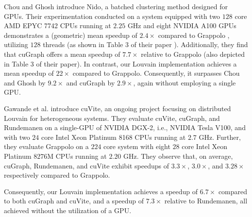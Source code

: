 Chou and Ghosh \cite{chou2022batched} introduce Nido, a batched clustering method designed for GPUs. Their experimentation conducted on a system equipped with two $128$ core AMD EPYC 7742 CPUs running at $2.25$ GHz and eight NVIDIA A100 GPUs demonstrates a (geometric) mean speedup of $2.4\times$ compared to Grappolo \cite{com-halappanavar17}, utilizing $128$ threads (as shown in Table 3 of their paper \cite{chou2022batched}). Additionally, they find that cuGraph \cite{hricik2020using} offers a mean speedup of $7.7\times$ relative to Grappolo (also depicted in Table 3 of their paper). In contrast, our Louvain implementation achieves a mean speedup of $22\times$ compared to Grappolo. Consequently, it surpasses Chou and Ghosh by $9.2\times$ and cuGraph by $2.9\times$, again without employing a single GPU.

Gawande et al. \cite{com-gawande22} introduce cuVite, an ongoing project focusing on distributed Louvain for heterogeneous systems. They evaluate cuVite, cuGraph, and Rundemanen on a single-GPU of NVIDIA DGX-2, i.e., NVIDIA Tesla V100, and with two $24$ core Intel Xeon Platinum 8168 CPUs running at $2.7$ GHz. Further, they evaluate Grappolo on a $224$ core system with eight $28$ core Intel Xeon Platinum 8276M CPUs running at $2.20$ GHz. They observe that, on average, cuGraph, Rundemanen, and cuVite exhibit speedups of $3.3\times$, $3.0\times$, and $3.28\times$ respectively compared to Grappolo.  Consequently, our Louvain implementation achieves a speedup of $6.7\times$ compared to both cuGraph and cuVite, and a speedup of $7.3\times$ relative to Rundemanen, all achieved without the utilization of a GPU.
